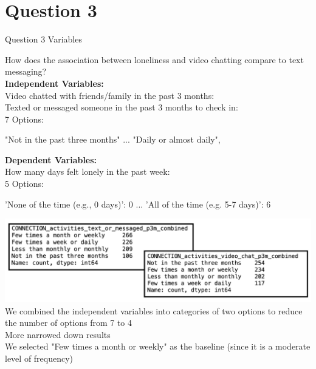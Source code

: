 \documentclass{beamer}
\begin{document}
\section{Question 3}
\begin{frame}{Question 3 Variables}

\small %
How does the association between loneliness and video chatting compare
to text messaging?\\

\vspace{0.5em} %
\textbf{Independent Variables:}\\
\vspace{0.2em}
Video chatted with friends/family in the past 3 months:\\
Texted or messaged someone in the past 3 months to check in:\\

\vspace{0.5em}
7 Options:
\begin{itemize}
    "Not in the past three months" ...
    "Daily or almost daily",
\end{itemize}

\vspace{0.5em}
\textbf{Dependent Variables:}\\
\vspace{0.2em}
How many days felt lonely in the past week:\\

\vspace{0.5em}
5 Options:
\begin{itemize}
    'None of the time (e.g., 0 days)': 0 ... 'All of the time (e.g. 5-7 days)': 6
\end{itemize}

\end{frame}

\begin{frame}
\includegraphics[width=\linewidth]{presentation/Screenshot 2024-12-01 at 12.16.24 PM.png}
We combined the independent variables into categories of two options to reduce the number of options from 7 to 4\\
More narrowed down results\\
\vspace{1em}
\small We selected "Few times a month or weekly" as the baseline (since it is a moderate level of frequency)
\end{frame}
\end{document}
